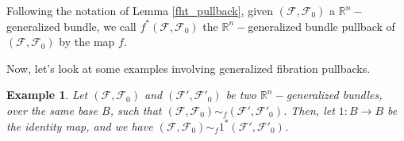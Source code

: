 \documentclass[12pt,oneside]{book}
\newtheorem{ex}     {Example}[chapter]
\newcommand{\R}{\mathbb{R}}
\begin{document}
    Following the notation of Lemma \ref{fht_pullback}, given $(\mathcal{F},\mathcal{F}_{0})$ a $\R^{n}-$generalized bundle, we call 
    $f^{*}(\mathcal{F},\mathcal{F}_{0})$ the $\R^{n}-$generalized bundle pullback of 
    $(\mathcal{F},\mathcal{F}_{0})$ by the map $f$.

    Now, let's look at some examples involving generalized fibration pullbacks.
    
    \begin{ex}\label{fht_pullback_ex1}
    Let $(\mathcal{F},\mathcal{F}_{0})$ and $(\mathcal{F'},\mathcal{F'}_{0})$ be two $\R^{n}-$generalized bundles, over the same base $B$, 
    such that $(\mathcal{F},\mathcal{F}_{0})\sim_{f} (\mathcal{F'},\mathcal{F'}_{0})$. Then, let $1:B\to B$ be the identity map, and we have 
    $(\mathcal{F},\mathcal{F}_{0})\sim_{f} 1^{*}(\mathcal{F'},\mathcal{F'}_{0})$.
    \end{ex}
\end{document}
